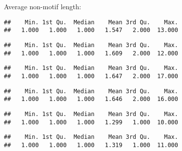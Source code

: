 \documentclass[
]{article}
\newenvironment{Shaded}{\begin{snugshade}}{\end{snugshade}}
\newcommand{\DecValTok}[1]{\textcolor[rgb]{0.00,0.00,0.81}{#1}}
\newcommand{\KeywordTok}[1]{\textcolor[rgb]{0.13,0.29,0.53}{\textbf{#1}}}
\newcommand{\NormalTok}[1]{#1}
\newcommand{\OperatorTok}[1]{\textcolor[rgb]{0.81,0.36,0.00}{\textbf{#1}}}
\begin{document}
Average non-motif length:

\begin{verbatim}
##    Min. 1st Qu.  Median    Mean 3rd Qu.    Max. 
##   1.000   1.000   1.000   1.547   2.000  13.000
\end{verbatim}

\begin{verbatim}
##    Min. 1st Qu.  Median    Mean 3rd Qu.    Max. 
##   1.000   1.000   1.000   1.609   2.000  12.000
\end{verbatim}

\begin{verbatim}
##    Min. 1st Qu.  Median    Mean 3rd Qu.    Max. 
##   1.000   1.000   1.000   1.647   2.000  17.000
\end{verbatim}

\begin{Shaded}
\end{Shaded}

\begin{verbatim}
##    Min. 1st Qu.  Median    Mean 3rd Qu.    Max. 
##   1.000   1.000   1.000   1.646   2.000  16.000
\end{verbatim}

\begin{Shaded}
\end{Shaded}

\begin{verbatim}
##    Min. 1st Qu.  Median    Mean 3rd Qu.    Max. 
##   1.000   1.000   1.000   1.299   1.000  10.000
\end{verbatim}

\begin{Shaded}
\end{Shaded}

\begin{verbatim}
##    Min. 1st Qu.  Median    Mean 3rd Qu.    Max. 
##   1.000   1.000   1.000   1.319   1.000  11.000
\end{verbatim}
\end{document}

